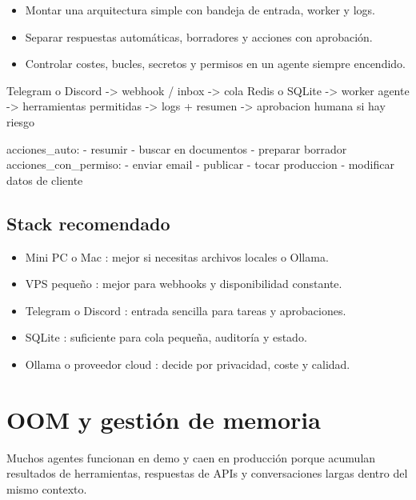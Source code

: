 \documentclass[11pt,a4paper]{book}
\begin{document}
\begin{itemize}\item Montar una arquitectura simple con bandeja de entrada, worker y logs.\end{itemize}
\begin{itemize}\item Separar respuestas automáticas, borradores y acciones con aprobación.\end{itemize}
\begin{itemize}\item Controlar costes, bucles, secretos y permisos en un agente siempre encendido.\end{itemize}
\begin{codebox}
Telegram o Discord
  -> webhook / inbox
  -> cola Redis o SQLite
  -> worker agente
  -> herramientas permitidas
  -> logs + resumen
  -> aprobacion humana si hay riesgo

acciones_auto:
  - resumir
  - buscar en documentos
  - preparar borrador
acciones_con_permiso:
  - enviar email
  - publicar
  - tocar produccion
  - modificar datos de cliente
\end{codebox}
\section{Stack recomendado}
\begin{itemize}\item Mini PC o Mac : mejor si necesitas archivos locales o Ollama.\end{itemize}
\begin{itemize}\item VPS pequeño : mejor para webhooks y disponibilidad constante.\end{itemize}
\begin{itemize}\item Telegram o Discord : entrada sencilla para tareas y aprobaciones.\end{itemize}
\begin{itemize}\item SQLite : suficiente para cola pequeña, auditoría y estado.\end{itemize}
\begin{itemize}\item Ollama o proveedor cloud : decide por privacidad, coste y calidad.\end{itemize}
\chapter{OOM y gestión de memoria}
Muchos agentes funcionan en demo y caen en producción porque acumulan resultados de herramientas, respuestas de APIs y conversaciones largas dentro del mismo contexto.
\end{document}
